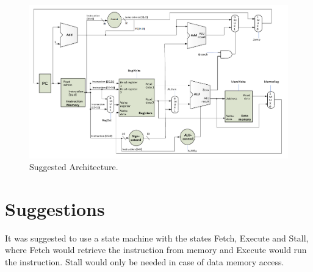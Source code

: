 \begin{figure}[ht]
    \centering
    \includegraphics[scale=0.3]{figures/suggestedarchitecture.png}
    \caption{\label{fig:sugarchi}Suggested Architecture.}
\end{figure}

\section{Suggestions}
It was suggested to use a state machine with the states Fetch, Execute and Stall, where Fetch would retrieve the instruction from memory and Execute would run the instruction. Stall would only be needed in case of data memory access.
